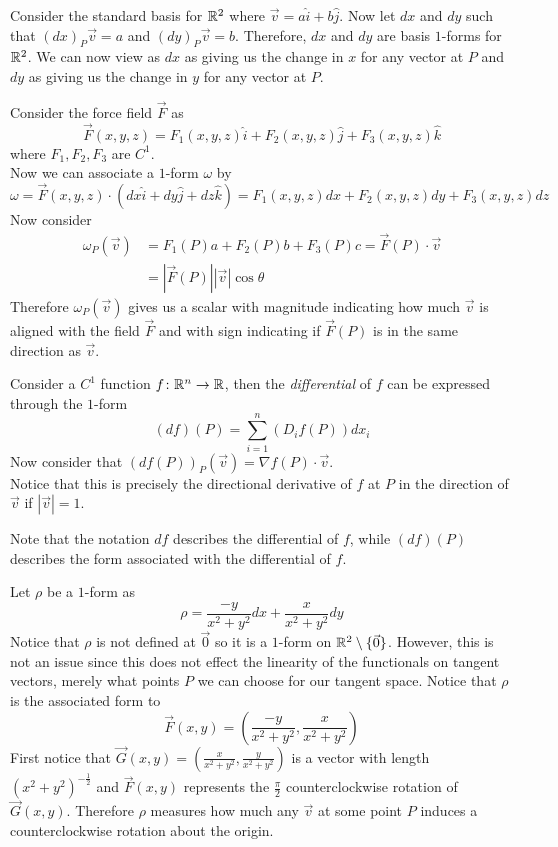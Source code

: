 \documentclass[notes.tex]{subfiles}
\begin{document}
\begin{example}
    Consider the standard basis for $\mathbb{R}^2$ where $\vec{v} = a\hat{i} + b\hat{j}$. Now let $dx$ and $dy$ such that $(dx)_P\vec{v} = a$ and $(dy)_P\vec{v} = b$. Therefore, $dx$ and $dy$ are basis $1$-forms for $\mathbb{R}^2$. We can now view as $dx$ as giving us the change in $x$ for any vector at $P$ and $dy$ as giving us the change in $y$ for any vector at $P$.
\end{example}

\begin{example}
    Consider the force field $\vec{F}$ as
    \[
        \vec{F}(x, y, z) = F_1(x, y, z)\hat{i} + F_2(x, y, z)\hat{j} + F_3(x, y, z)\hat{k}
    \]
    where $F_1, F_2, F_3$ are $C^1$. \\
    Now we can associate a $1$-form $\omega$ by
    \[
        \omega = \vec{F}(x, y, z)\cdot(dx\hat{i} + dy\hat{j} + dz\hat{k}) = F_1(x, y, z)dx + F_2(x, y, z)dy + F_3(x, y, z)dz
    \]
    Now consider
    \begin{align*}
        \omega_P(\vec{v})
        &= F_1(P)a + F_2(P)b + F_3(P)c
        = \vec{F}(P)\cdot\vec{v} \\
        &= |\vec{F}(P)||\vec{v}|\cos\theta
    \end{align*}
    Therefore $\omega_P(\vec{v})$ gives us a scalar with magnitude indicating how much $\vec{v}$ is aligned with the field $\vec{F}$ and with sign indicating if $\vec{F}(P)$ is in the same direction as $\vec{v}$.
\end{example}

\begin{definition}[Differential]
    Consider a $C^1$ function $f\colon \mathbb{R}^n \to \mathbb{R}$, then the \textit{differential} of $f$ can be expressed through the $1$-form
    \[
        (df)(P) = \sum_{i = 1}^n (D_i f(P)) dx_i
    \]
    Now consider that $(df(P))_P(\vec{v}) = \nabla f(P)\cdot \vec{v}$. \\
    Notice that this is precisely the directional derivative of $f$ at $P$ in the direction of $\vec{v}$ if $|\vec{v}| = 1$.
\end{definition}

Note that the notation $df$ describes the differential of $f$, while $(df)(P)$ describes the form associated with the differential of $f$.

\begin{example}
    Let $\rho$ be a $1$-form as
    \[
        \rho = \frac{-y}{x^2 + y^2}dx + \frac{x}{x^2 + y^2}dy
    \]
    Notice that $\rho$ is not defined at $\vec{0}$ so it is a $1$-form on $\mathbb{R}^2 \setminus \{ \vec{0} \}$. However, this is not an issue since this does not effect the linearity of the functionals on tangent vectors, merely what points $P$ we can choose for our tangent space. Notice that $\rho$ is the associated form to
    \[
        \vec{F}(x, y) = \left( \frac{-y}{x^2 + y^2}, \frac{x}{x^2 + y^2} \right)
    \]
    First notice that $\vec{G}(x, y) =\left( \frac{x}{x^2 + y^2}, \frac{y}{x^2 + y^2} \right)$ is a vector with length $(x^2 + y^2)^{-\frac{1}{2}}$ and $\vec{F}(x, y)$ represents the $\frac{\pi}{2}$ counterclockwise rotation of $\vec{G}(x, y)$. Therefore $\rho$ measures how much any $\vec{v}$ at some point $P$ induces a counterclockwise rotation about the origin.
\end{example}
\end{document}
